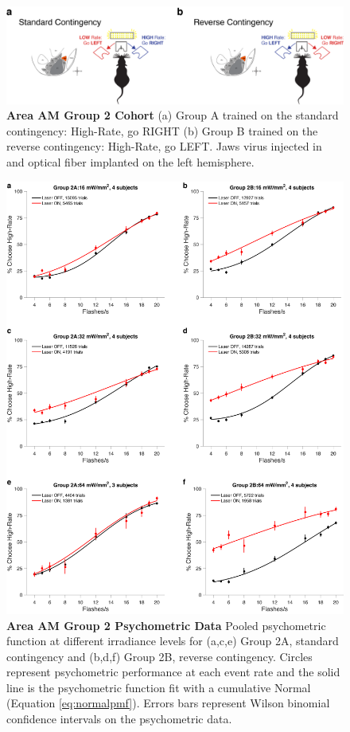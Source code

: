 \begin{figure}
  \centering
   \includegraphics[width=\textwidth]{Figures/chapter4/jaws_AM_group2_schematic.png}
  \caption[Area AM Group 2 Cohort]{\textbf{Area AM Group 2 Cohort} (a) Group A trained on the standard contingency: High-Rate, go RIGHT (b) Group B trained on the reverse contingency: High-Rate, go LEFT. Jaws virus injected in and optical fiber implanted on the left hemisphere.}
   \label{fig:AMgroup2schem}
\end{figure}
\begin{figure}
  \centering
   \includegraphics[width=\textwidth,height=0.9\textheight,keepaspectratio]{Figures/chapter4/jaws_AM_group2_summary_PMFs_irradiance.png}
  \caption[Area AM Group 2 Psychometric Data]{\textbf{Area AM Group 2 Psychometric Data} Pooled psychometric function at different irradiance levels for (a,c,e) Group 2A, standard contingency and (b,d,f) Group 2B, reverse contingency. Circles represent psychometric performance at each event rate and the solid line is the psychometric function fit with a cumulative Normal (Equation \ref{eq:normalpmf}). Errors bars represent Wilson binomial confidence intervals on the psychometric data.}
   \label{fig:AMgroup2summary}
\end{figure}
